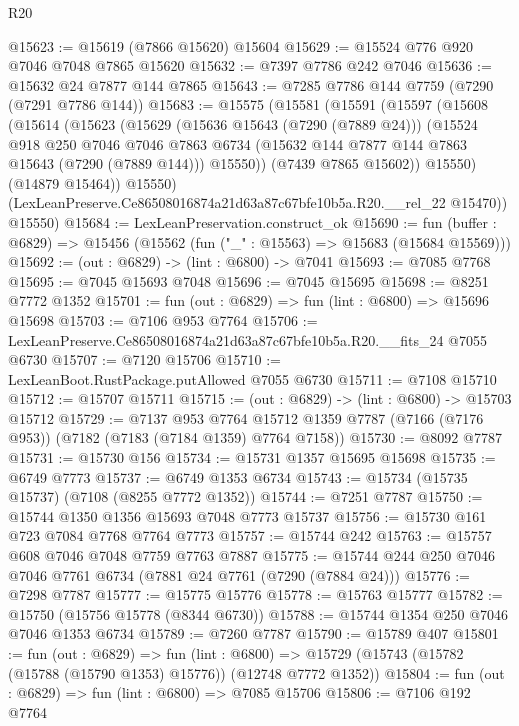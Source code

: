 \begin{lexlean}{R20}
\begin{coremodule}
{@15623 := @15619 (@7866 @15620) @15604
@15629 := @15524 @776 @920 @7046 @7048 @7865 @15620
@15632 := @7397 @7786 @242 @7046
@15636 := @15632 @24 @7877 @144 @7865
@15643 := @7285 @7786 @144 @7759 (@7290 (@7291 @7786 @144))
@15683 := @15575
    (@15581
      (@15591
        (@15597
          (@15608
            (@15614
              (@15623
                (@15629
                  (@15636 @15643 (@7290 (@7889 @24)))
                  (@15524
                    @918
                    @250
                    @7046
                    @7046
                    @7863
                    @6734
                    (@15632 @144 @7877 @144 @7863 @15643 (@7290 (@7889 @144)))
                    @15550))
                (@7439 @7865 @15602))
              @15550)
            (@14879 @15464))
          @15550)
        (LexLeanPreserve.Ce86508016874a21d63a87c67bfe10b5a.R20.__rel_22 @15470))
      @15550)
@15684 := LexLeanPreservation.construct_ok
@15690 := fun (buffer : @6829) => @15456 (@15562 (fun ("_" : @15563) => @15683 (@15684 @15569)))
@15692 := (out : @6829) -> (lint : @6800) -> @7041
@15693 := @7085 @7768
@15695 := @7045 @15693 @7048
@15696 := @7045 @15695
@15698 := @8251 @7772 @1352
@15701 := fun (out : @6829) => fun (lint : @6800) => @15696 @15698
@15703 := @7106 @953 @7764
@15706 := LexLeanPreserve.Ce86508016874a21d63a87c67bfe10b5a.R20.__fits_24 @7055 @6730
@15707 := @7120 @15706
@15710 := LexLeanBoot.RustPackage.putAllowed @7055 @6730
@15711 := @7108 @15710
@15712 := @15707 @15711
@15715 := (out : @6829) -> (lint : @6800) -> @15703 @15712
@15729 := @7137
    @953
    @7764
    @15712
    @1359
    @7787
    (@7166 (@7176 @953))
    (@7182 (@7183 (@7184 @1359) @7764 @7158))
@15730 := @8092 @7787
@15731 := @15730 @156
@15734 := @15731 @1357 @15695 @15698
@15735 := @6749 @7773
@15737 := @6749 @1353 @6734
@15743 := @15734 (@15735 @15737) (@7108 (@8255 @7772 @1352))
@15744 := @7251 @7787
@15750 := @15744 @1350 @1356 @15693 @7048 @7773 @15737
@15756 := @15730 @161 @723 @7084 @7768 @7764 @7773
@15757 := @15744 @242
@15763 := @15757 @608 @7046 @7048 @7759 @7763 @7887
@15775 := @15744 @244 @250 @7046 @7046 @7761 @6734 (@7881 @24 @7761 (@7290 (@7884 @24)))
@15776 := @7298 @7787
@15777 := @15775 @15776
@15778 := @15763 @15777
@15782 := @15750 (@15756 @15778 (@8344 @6730))
@15788 := @15744 @1354 @250 @7046 @7046 @1353 @6734
@15789 := @7260 @7787
@15790 := @15789 @407
@15801 := fun (out : @6829) =>
  fun (lint : @6800) => @15729 (@15743 (@15782 (@15788 (@15790 @1353) @15776)) (@12748 @7772 @1352))
@15804 := fun (out : @6829) => fun (lint : @6800) => @7085 @15706
@15806 := @7106 @192 @7764
}
\end{coremodule}
\end{lexlean}
